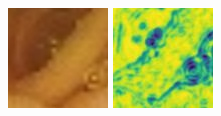 \documentclass[conference]{IEEEtran}
\begin{document}
\begin{figure}[!t]
    \endminipage\hfill
        \centering
        \includegraphics[width=\linewidth]{Figures/520/520_bicubic.jpg}
        
        \vfill
        \includegraphics[width=\linewidth]{Figures/520/520_Bicubical_ssim.jpg}
         

\end{figure}
\end{document}
